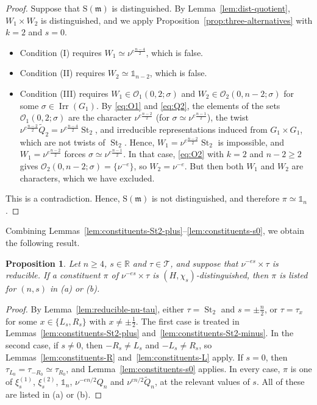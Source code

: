 \documentclass[11pt]{amsart}
\numberwithin{equation}{section}
\theoremstyle{plain}
\newtheorem{proposition}[theorem]{Proposition}
\theoremstyle{definition}
\theoremstyle{remark}
\newcommand{\R}{\mathbb{R}}
\newcommand{\one}{\mathds{1}}
\newcommand{\T}{\mathcal{T}}
\DeclareMathOperator{\Irr}{Irr}
\DeclareMathOperator{\St}{St}
\newcommand{\Qt}{\widetilde{Q}}
\newcommand{\xione}{\xi^{(1)}}
\newcommand{\xitwo}{\xi^{(2)}}
\newcommand{\mm}{\mathfrak{m}}
\newcommand{\Ss}{\mathrm{S}}
\begin{document}
\begin{proof}
	Suppose that $\Ss(\mm)$ is distinguished. By Lemma~\ref{lem:dist-quotient}, $W_1\times W_2$ is distinguished, and we apply Proposition~\ref{prop:three-alternatives} with $k=2$ and $s=0$.
	\begin{itemize}
		\item Condition (I) requires $W_1\simeq\nu^{e\frac{n-4}2}$, which is false.
		\item Condition (II) requires $W_2\simeq\one_{n-2}$, which is false.
		\item Condition (III) requires $W_1\in\mathcal O_1(0,2;\sigma)$ and $W_2\in\mathcal O_2(0,n-2;\sigma)$ for some $\sigma\in\Irr(G_1)$. By \eqref{eq:O1} and \eqref{eq:Q2}, the elements of the sets $\mathcal O_1(0,2;\sigma)$ are the character $\nu^{e\frac{n-2}2}$ (for $\sigma\simeq\nu^{e\frac{n-1}2}$), the twist $\nu^{e\frac{n-2}2}\Qt_2=\nu^{e\frac{n-4}2}\St_2$, and irreducible representations induced from $G_1\times G_1$, which are not twists of $\St_2$. Hence, $W_1=\nu^{e\frac{n-2}2}\St_2$ is impossible, and $W_1=\nu^{e\frac{n-2}2}$ forces $\sigma\simeq\nu^{e\frac{n-1}2}$. In that case, \eqref{eq:O2} with $k=2$ and $n-2\ge2$ gives $\mathcal O_2(0,n-2;\sigma)=\{\nu^{-e}\}$, so $W_2=\nu^{-e}$. But then both $W_1$ and $W_2$ are characters, which we have excluded.
	\end{itemize}
	This is a contradiction. Hence, $\Ss(\mm)$ is not distinguished, and therefore $\pi\simeq\one_n$.
\end{proof}

Combining Lemmas~\ref{lem:constituents-St2-plus}--\ref{lem:constituents-s0}, we obtain the following result.

\begin{proposition}\label{prop:constituents-reducible}
	Let $n\ge4$, $s\in\R$ and $\tau\in\T$, and suppose that $\nu^{-es}\times\tau$ is reducible. If a constituent $\pi$ of $\nu^{-es}\times\tau$ is $(H,\chi_s)$-distinguished, then $\pi$ is listed for $(n,s)$ in \textup{(a)} or \textup{(b)}.
\end{proposition}

\begin{proof}
	By Lemma~\ref{lem:reducible-nu-tau}, either $\tau=\St_2$ and $s=\pm\frac n2$, or $\tau=\tau_x$ for some $x\in\{L_s,R_s\}$ with $x\ne\pm\frac12$. The first case is treated in Lemmas~\ref{lem:constituents-St2-plus} and~\ref{lem:constituents-St2-minus}. In the second case, if $s\ne0$, then $-R_s\ne L_s$ and $-L_s\ne R_s$, so Lemmas~\ref{lem:constituents-R} and~\ref{lem:constituents-L} apply. If $s=0$, then $\tau_{L_0}=\tau_{-R_0}\simeq\tau_{R_0}$, and Lemma~\ref{lem:constituents-s0} applies. In every case, $\pi$ is one of $\xione_s$, $\xitwo_s$, $\one_n$, $\nu^{-en/2}Q_n$ and $\nu^{en/2}\Qt_n$, at the relevant values of $s$. All of these are listed in (a) or (b).
\end{proof}
\end{document}
